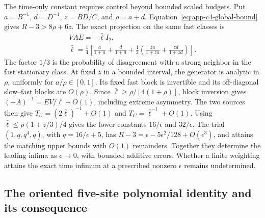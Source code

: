 \documentclass[aps,pre,reprint,amsmath,amssymb,longbibliography]{revtex4-2}
\begin{document}
The time-only constant requires control beyond bounded scaled budgets.
Put \(a=B^{-1}\), \(d=D^{-1}\), \(z=BD/C\), and
\(\rho=a+d\). Equation~\eqref{eq:app-c4-global-bound} gives
\(R-3>8\rho+6z\). The exact projection on the same fast classes is
\begin{equation}
 \begin{gathered}
 VAE=-\bar\ell I_2,\\
 \bar\ell=\frac14\left[
 \frac a{1+a}+\frac d{1+d}
 +\frac13\left(\frac{za}{1+za}+\frac{zd}{1+zd}\right)\right].
 \end{gathered}
 \label{eq:app-c4-exact-escape}
\end{equation}
The factor \(1/3\) is the probability of disagreement with a strong
neighbor in the fast stationary class. At fixed \(z\) in a bounded
interval, the generator is analytic in \(\rho\), uniformly for
\(a/\rho\in[0,1]\). Its fixed fast block is invertible and its
off-diagonal slow--fast blocks are \(O(\rho)\). Since
\(\bar\ell\ge\rho/[4(1+\rho)]\), block inversion gives
\((-A)^{-1}=EV/\bar\ell+O(1)\), including extreme asymmetry.
The two sources then give \(T_U=(2\bar\ell)^{-1}+O(1)\) and
\(T_C=\bar\ell^{-1}+O(1)\). Using
\(\bar\ell\le\rho(1+z/3)/4\) gives the lower constants
\(16/\epsilon\) and \(32/\epsilon\).
The trial \((1,q,q^4,q)\), with \(q=16/\epsilon+5\), has
\(R-3=\epsilon-5\epsilon^2/128+O(\epsilon^3)\), and attains
the matching upper bounds with \(O(1)\) remainders. Together they
determine the leading infima as \(\epsilon\to0\), with bounded
additive errors. Whether a finite weighting attains the exact time
infimum at a prescribed nonzero \(\epsilon\) remains undetermined. 

\subsection{The oriented five-site polynomial identity and its consequence}
\end{document}
